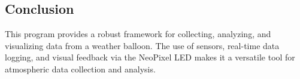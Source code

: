 \documentclass{article}
\begin{document}
\subsection{Conclusion}
This program provides a robust framework for collecting, analyzing, and visualizing data from a weather balloon. The use of sensors, real-time data logging, and visual feedback via the NeoPixel LED makes it a versatile tool for atmospheric data collection and analysis.
\end{document}
